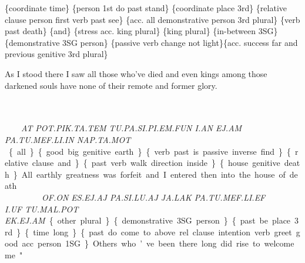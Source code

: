 {\{coordinate time\} \{person 1st do past stand\} \{coordinate place 3rd\} \{relative clause person first verb past see\} \{acc. all demonstrative person 3rd plural\} \{verb past death\} \{and\} \{stress acc. king plural\} \{king plural\} \{in-between 3SG\} \{demonstrative 3SG person\} \{passive verb change not light\}\{acc. success far and previous genitive 3rd plural\}

As I stood there I saw all those who've died and even kings among those darkened souls have none of their remote and former glory. 
 
\drie 

\at ~ \pot\pik\ta\tem ~ \tu\pa\si\Atlanpi\Atlanem\fun ~ \Atlani\an ~ \ej\am ~ \\\pa\tu\mef\li\Atlanin~ \\\nap\ta\mot

{\it AT POT.PIK.TA.TEM TU.PA.SI.PI.EM.FUN I.AN EJ.AM \\PA.TU.MEF.LI.IN NAP.TA.MOT }


\{all\} \{good big genitive earth\} \{verb past is passive inverse find\} \{relative clause and\} \{past verb walk direction inside\} \{house genitive death\} 

All earthly greatness was forfeit and I entered then into the house of death.  
 
 
\drie


\of\on ~ \es\ej\aj ~ \pa\si\lu\aj ~ \ja\lak ~ \pa\tu\mef\li\ef~\\\Atlani\uf~\tu\mal\pot~\ek\ej\am 

{\it OF.ON ES.EJ.AJ PA.SI.LU.AJ JA.LAK PA.TU.MEF.LI.EF \\I.UF TU.MAL.POT EK.EJ.AM} 


\{other plural\} \{demonstrative 3SG person\} \{past be place 3rd\} \{time long\} \{past do come to above rel.clause intention verb greet good acc. person 1SG\}

Others who’ve been there long did rise to welcome me." 


}

